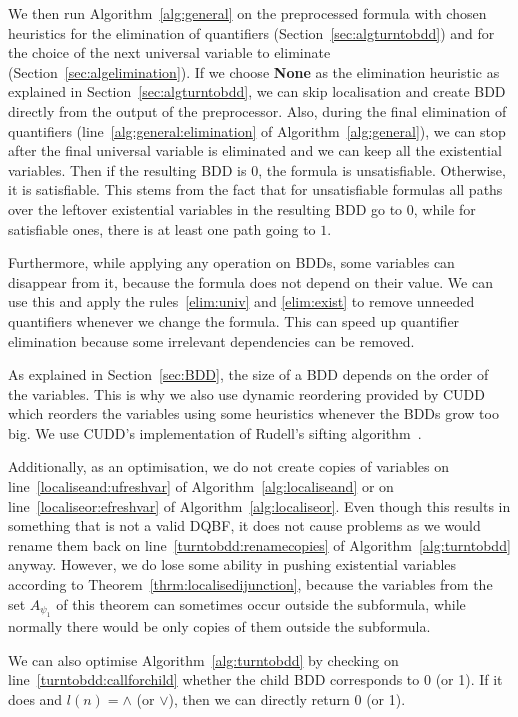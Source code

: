 \documentclass[
  digital, %
  color,
  twoside, %
  table,   %
  nolof,     %
  nolot,     %
]{fithesis3}
\theoremstyle{definition}
\theoremstyle{remark}
\newcommand{\qtlabel}[1]{l({#1})}
\newcommand{\QEnone}{\textbf{None}}
\begin{document}
We then run Algorithm~\ref{alg:general} on the preprocessed formula with chosen heuristics for the elimination of quantifiers (Section~\ref{sec:algturntobdd}) and for the choice of the next universal variable to eliminate (Section~\ref{sec:algelimination}). If we choose \QEnone{} as the elimination heuristic as explained in Section~\ref{sec:algturntobdd}, we can skip localisation and create BDD directly from the output of the preprocessor. Also, during the final elimination of quantifiers (line~\ref{alg:general:elimination} of Algorithm~\ref{alg:general}), we can stop after the final universal variable is eliminated and we can keep all the existential variables. Then if the resulting BDD is $0$, the formula is unsatisfiable. Otherwise, it is satisfiable. This stems from the fact that for unsatisfiable formulas all paths over the leftover existential variables in the resulting BDD go to $0$, while for satisfiable ones, there is at least one path going to $1$.

Furthermore, while applying any operation on BDDs, some variables can disappear from it, because the formula does not depend on their value. We can use this and apply the rules~\eqref{elim:univ} and \eqref{elim:exist} to remove unneeded quantifiers whenever we change the formula. This can speed up quantifier elimination because some irrelevant dependencies can be removed.

As explained in Section~\ref{sec:BDD}, the size of a BDD depends on the order of the variables. This is why we also use dynamic reordering provided by CUDD which reorders the variables using some heuristics whenever the BDDs grow too big. We use CUDD's implementation of Rudell's sifting algorithm~\cite{BDDsifting}.

Additionally, as an optimisation, we do not create copies of variables on line~\ref{localiseand:ufreshvar} of Algorithm~\ref{alg:localiseand} or on line~\ref{localiseor:efreshvar} of Algorithm~\ref{alg:localiseor}. Even though this results in something that is not a valid DQBF, it does not cause problems as we would rename them back on line~\ref{turntobdd:renamecopies} of Algorithm~\ref{alg:turntobdd} anyway. However, we do lose some ability in pushing existential variables according to Theorem~\ref{thrm:localisedijunction}, because the variables from the set $A_{\psi_1}$ of this theorem can sometimes occur outside the subformula, while normally there would be only copies of them outside the subformula.

We can also optimise Algorithm~\ref{alg:turntobdd} by checking on line~\ref{turntobdd:callforchild} whether the child BDD corresponds to 0 (or 1). If it does and $\qtlabel{n} = {\land}$ (or ${\lor}$), then we can directly return 0 (or 1).
\end{document}
